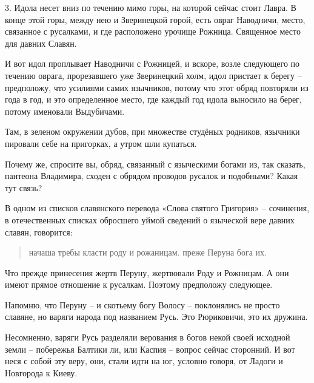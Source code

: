 3. Идола несет вниз по течению мимо горы, на которой сейчас стоит Лавра. В конце этой горы, между нею и Зверинецкой горой, есть овраг Наводничи, место, связанное с русалками, и где расположено урочище Рожница. Священное место для давних Славян.

   И вот идол проплывает Наводничи с Рожницей, и вскоре, возле следующего по течению оврага, прорезавшего уже Зверинецкий холм, идол пристает к берегу – предположу, что усилиями самих язычников, потому что этот обряд повторяли из года в год, и это определенное место, где каждый год идола выносило на берег, потому именовали Выдубичами. 

   Там, в зеленом окружении дубов, при множестве студёных родников, язычники пировали себе на пригорках, а утром шли купаться.

   Почему же, спросите вы, обряд, связанный с языческими богами из, так сказать, пантеона Владимира, сходен с обрядом проводов русалок и подобными? Какая тут связь?

   В одном из списков славянского перевода «Слова святого Григория» – сочинения, в отечественных списках обросшего уймой сведений о языческой вере давних славян, говорится:

\begin{quotation}
начаша требы класти роду и рожаницам.
преже Перуна бога их.
\end{quotation}

   Что прежде принесения жертв Перуну, жертвовали Роду и Рожницам. А они имеют прямое отношение к русалкам. Поэтому предположу следующее.

   Напомню, что Перуну – и скотьему богу Волосу – поклонялись не просто славяне, но варяги народа под названием Русь. Это Рюриковичи, это их дружина. 



    Несомненно, варяги Русь разделяли верования в богов некой своей исходной земли – побережья Балтики ли, или Каспия – вопрос сейчас сторонний. И вот неся с собой эту веру, они, стали идти на юг, условно говоря, от Ладоги и Новгорода к Киеву. 

